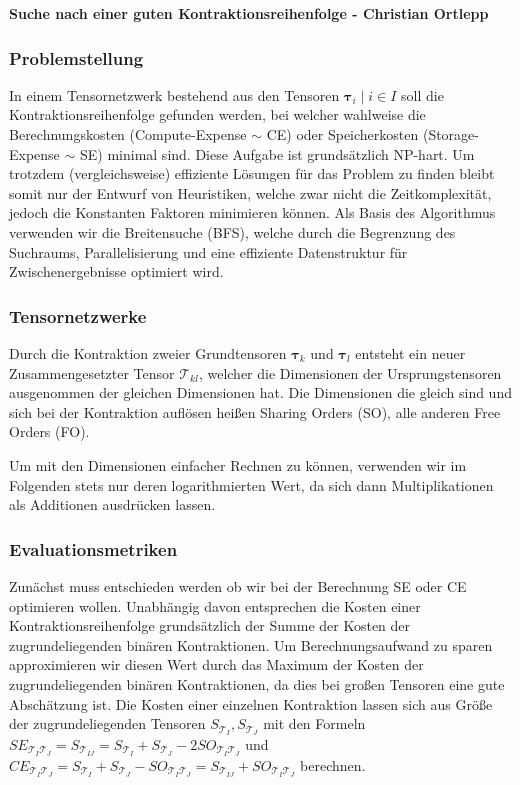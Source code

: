 \documentclass{article}
\begin{document}
\newcommand{\qg}[1]{\glqq{}#1\grqq{}}
\newcommand{\Tau}{\bm{\mathcal{T}}}
\newcommand{\tauB}{\bm{\tau}}

\begin{center}
    {\large \textbf{Suche nach einer guten Kontraktionsreihenfolge - Christian Ortlepp}}
   \end{center}
   
\subsubsection*{Problemstellung}

In einem Tensornetzwerk bestehend aus den Tensoren $\tauB_i \mid i\in I$ soll die Kontraktionsreihenfolge gefunden werden, bei welcher wahlweise die Berechnungskosten (Compute-Expense $\sim$ CE) oder Speicherkosten (Storage-Expense $\sim$ SE) minimal sind.
Diese Aufgabe ist grundsätzlich NP-hart. Um trotzdem (vergleichsweise) effiziente Lösungen für das Problem zu finden bleibt somit nur der Entwurf von Heuristiken, welche zwar nicht die Zeitkomplexität, jedoch die Konstanten Faktoren minimieren können. Als Basis des Algorithmus verwenden wir die Breitensuche (BFS), welche durch die Begrenzung des Suchraums, Parallelisierung und eine effiziente Datenstruktur für Zwischenergebnisse optimiert wird.

\subsubsection*{Tensornetzwerke}

Durch die Kontraktion zweier Grundtensoren $\tauB_k$ und $\tauB_l$ entsteht ein neuer Zusammengesetzter Tensor $\Tau_{kl}$, welcher die Dimensionen der Ursprungstensoren ausgenommen der gleichen Dimensionen hat. Die Dimensionen die gleich sind und sich bei der Kontraktion auflösen heißen \qg{Sharing Orders} (SO), alle anderen \qg{Free Orders} (FO).

Um mit den Dimensionen einfacher Rechnen zu können, verwenden wir im Folgenden stets nur deren logarithmierten Wert, da sich dann Multiplikationen als Additionen ausdrücken lassen.

\subsubsection*{Evaluationsmetriken}

Zunächst muss entschieden werden ob wir bei der Berechnung SE oder CE optimieren wollen. Unabhängig davon entsprechen die Kosten einer Kontraktionsreihenfolge grundsätzlich der Summe der Kosten der zugrundeliegenden binären Kontraktionen. Um Berechnungsaufwand zu sparen approximieren wir diesen Wert durch das Maximum der Kosten der zugrundeliegenden binären Kontraktionen, da dies bei großen Tensoren eine gute Abschätzung ist.
Die Kosten einer einzelnen Kontraktion lassen sich aus Größe der zugrundeliegenden Tensoren $S_{\Tau_I}, S_{\Tau_J}$ mit den Formeln $SE_{\Tau_I\Tau_J}=S_{\Tau_{IJ}}=S_{\Tau_I}+S_{\Tau_J}-2SO_{\Tau_I\Tau_J}$ und $CE_{\Tau_I\Tau_J}=S_{\Tau_I}+S_{\Tau_J}-SO_{\Tau_I\Tau_J}=S_{\Tau_{IJ}}+SO_{\Tau_I\Tau_J}$ berechnen.
\end{document}
